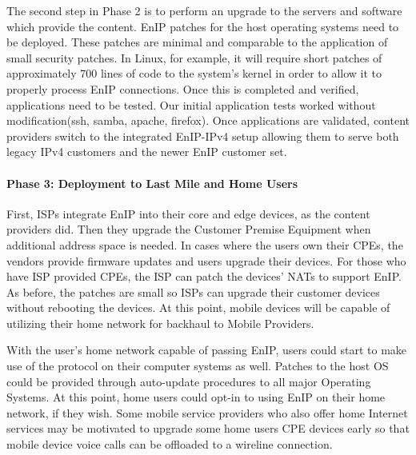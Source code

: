 The second step in Phase 2 is to perform an upgrade to the servers
and software which provide the content.  EnIP patches for the host
operating systems need to be deployed.  These patches are minimal and
comparable to the application of small security patches.  In Linux,
for example, it will require short patches of approximately 700
lines of code to the system's kernel in order to allow it to properly
process EnIP connections.  Once this is completed and
verified, applications need to be tested.  Our initial application
tests worked without modification(ssh, samba, apache, firefox).  
Once applications are validated,
content providers switch to the integrated EnIP-IPv4 setup allowing
them to serve both legacy IPv4 customers and the newer EnIP customer set.

\paragraph{Phase 3: Deployment to Last Mile and Home Users}
First, ISPs integrate EnIP into their core and edge devices, as
the content providers did.  Then they upgrade the Customer Premise
Equipment when additional address space is needed.  In cases where
the users own their CPEs, the vendors provide firmware updates and
users upgrade their devices.  For those who have ISP provided CPEs, the
ISP can patch the devices' NATs to support EnIP.  As before, the
patches are small so ISPs can upgrade their customer devices without
rebooting the devices.  At this point, mobile devices will be capable
of utilizing their home network for backhaul to Mobile Providers.

With the user's home network capable of passing EnIP, users could
start to make use of the protocol on their computer systems
as well.  Patches to the host OS could be provided through
auto-update procedures to all major Operating Systems.  At this
point, home users could opt-in to using EnIP on their home network,
if they wish.  Some mobile service providers who also offer home Internet services
may be motivated to upgrade some home users CPE devices early so that mobile device
voice calls can be offloaded to a wireline connection.
